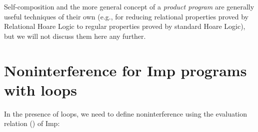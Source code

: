 \documentclass[12pt]{report}
\begin{document}
Self-composition and the more general concept of a \textit{product program}
    are generally useful techniques of their own (e.g., for reducing
    relational properties proved by Relational Hoare Logic to regular
    properties proved by standard Hoare Logic), but we will not
    discuss them here any further. 
\begin{coqdoccode}
\coqdocemptyline
\end{coqdoccode}
\section{Noninterference for Imp programs with loops}



 In the presence of loops, we need to define noninterference using the
    evaluation relation () of Imp: 
\end{document}
